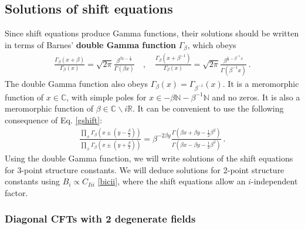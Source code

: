 \documentclass[12pt, a4paper]{article}
\newcommand{\myindex}[1]{\textbf{\boldmath #1}}
\begin{document}
\subsection{Solutions of shift equations}\label{sec:essc}

Since shift equations produce Gamma functions, their solutions should be written in terms of Barnes' \myindex{double Gamma function} $\Gamma_\beta$, which obeys
\begin{align}
\frac{\Gamma_\beta(x+\beta)}{\Gamma_\beta(x)} = \sqrt{2\pi}\frac{\beta^{\beta x-\frac12}}{\Gamma(\beta x)}
\quad , \quad 
\frac{\Gamma_\beta(x+\beta^{-1})}{\Gamma_\beta(x)} = \sqrt{2\pi}\frac{\beta^{\frac12-\beta^{-1}x}}{\Gamma(\beta^{-1}x)} \ .
\label{gshift}
\end{align}
The double Gamma function also obeys $\Gamma_\beta(x)= \Gamma_{\beta^{-1}}(x)$. It is a meromorphic function of $x\in\mathbb{C}$, with simple poles for $x\in -\beta\mathbb{N}-\beta^{-1}\mathbb{N}$ and no zeros. It is also a meromorphic function of $\beta\in \mathbb{C}\backslash i\mathbb{R}$. It can be convenient to use the following consequence of Eq. \eqref{gshift}:
\begin{align}
 \frac{\prod_\pm \Gamma_\beta\left(x \pm (y-\frac{\beta}{2})\right)}{\prod_\pm \Gamma_\beta\left(x \pm (y+\frac{\beta}{2})\right)} = \beta^{-2\beta y}\frac{\Gamma\left(\beta x+\beta y - \frac12 \beta^2\right)}{\Gamma\left(\beta x-\beta y -\frac12 \beta^2\right)}\ . 
\end{align}
Using the double Gamma function, we will write solutions of the shift equations for 3-point structure constants. We will deduce solutions for 2-point structure constants using $B_i\propto C_{Iii}$ \eqref{bicii}, where the shift equations allow an $i$-independent factor. 

\subsubsection{Diagonal CFTs with 2 degenerate fields}\label{sec:dtdf}
\end{document}
